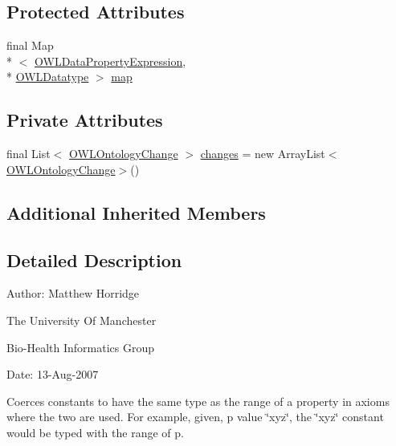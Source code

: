 \subsection*{Protected Attributes}
\begin{DoxyCompactItemize}
\item 
final Map\\*
$<$ \hyperlink{interfaceorg_1_1semanticweb_1_1owlapi_1_1model_1_1_o_w_l_data_property_expression}{O\-W\-L\-Data\-Property\-Expression}, \\*
\hyperlink{interfaceorg_1_1semanticweb_1_1owlapi_1_1model_1_1_o_w_l_datatype}{O\-W\-L\-Datatype} $>$ \hyperlink{classorg_1_1semanticweb_1_1owlapi_1_1_coerce_constants_into_data_property_range_a16fb74cc1eb905ccdc03c9199402f3f1}{map}
\end{DoxyCompactItemize}
\subsection*{Private Attributes}
\begin{DoxyCompactItemize}
\item 
final List$<$ \hyperlink{classorg_1_1semanticweb_1_1owlapi_1_1model_1_1_o_w_l_ontology_change}{O\-W\-L\-Ontology\-Change} $>$ \hyperlink{classorg_1_1semanticweb_1_1owlapi_1_1_coerce_constants_into_data_property_range_a8a747a2a71841a9228dac783962d8792}{changes} = new Array\-List$<$\hyperlink{classorg_1_1semanticweb_1_1owlapi_1_1model_1_1_o_w_l_ontology_change}{O\-W\-L\-Ontology\-Change}$>$()
\end{DoxyCompactItemize}
\subsection*{Additional Inherited Members}


\subsection{Detailed Description}
Author\-: Matthew Horridge\par
 The University Of Manchester\par
 Bio-\/\-Health Informatics Group\par
 Date\-: 13-\/\-Aug-\/2007\par
 \par
 

Coerces constants to have the same type as the range of a property in axioms where the two are used. For example, given, p value \char`\"{}xyz\char`\"{}, the \char`\"{}xyz\char`\"{} constant would be typed with the range of p. 


